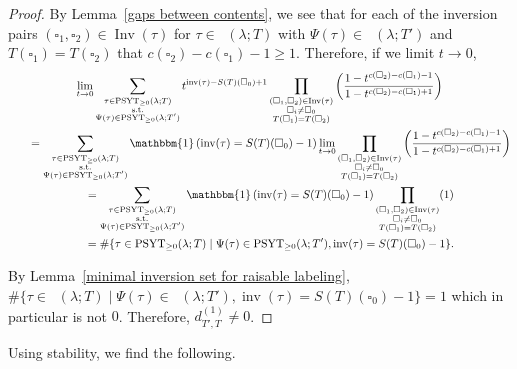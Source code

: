 \documentclass[10pt,a4paper]{amsart}
\numberwithin{equation}{section}
\theoremstyle{definition}
\DeclareMathOperator{\PSYT}{\mathrm{PSYT}_{\geq 0}}
\DeclareMathOperator{\Inv}{\mathrm{Inv}}
\DeclareMathOperator{\inv}{inv}
\begin{document}
\begin{proof}
By Lemma~\ref{gaps between contents}, we see that for each of the inversion pairs $(\square_1,\square_2) \in \Inv(\tau)$ for $\tau \in \PSYT(\lambda;T)$ with $\Psi(\tau) \in \PSYT(\lambda;T')$ and $T(\square_1) = T(\square_2)$ that $c(\square_2)-c(\square_1)-1 \geq 1$. Therefore, if we limit $t \rightarrow 0$,
\begin{gather*}
 \lim_{t \rightarrow 0} \sum_{\substack{\tau \in \PSYT(\lambda;T) \\ \text{s.t.}\\ \Psi(\tau) \in \PSYT(\lambda;T')}} t^{\inv(\tau) -S(T)(\square_0)+1} \prod_{\substack{(\square_1,\square_2) \in \Inv(\tau)\\ \square_i \neq \square_0 \\ T(\square_1)=T(\square_2)}} \left( \frac{1 - t^{c(\square_2)-c(\square_1)-1}}{1 -t^{c(\square_2)-c(\square_1)+1}} \right) \\
 \qquad = \sum_{\substack{\tau \in \PSYT(\lambda;T) \\ \text{s.t.}\\ \Psi(\tau) \in \PSYT(\lambda;T')}} \mathbbm{1}\left(\inv(\tau) = S(T)(\square_0)-1\right) \lim_{t \rightarrow 0} \prod_{\substack{(\square_1,\square_2) \in \Inv(\tau)\\ \square_i \neq \square_0 \\ T(\square_1)=T(\square_2)}} \left( \frac{1 - t^{c(\square_2)-c(\square_1)-1}}{1 -t^{c(\square_2)-c(\square_1)+1}} \right) \\
 \qquad = \sum_{\substack{\tau \in \PSYT(\lambda;T) \\ \text{s.t.}\\ \Psi(\tau) \in \PSYT(\lambda;T')}} \mathbbm{1}\left(\inv(\tau) = S(T)(\square_0)-1\right) \prod_{\substack{(\square_1,\square_2) \in \Inv(\tau)\\ \square_i \neq \square_0 \\ T(\square_1)=T(\square_2)}} (1) \\
 \qquad = \#\{ \tau \in \PSYT(\lambda;T) \mid \Psi(\tau) \in \PSYT(\lambda;T'), \inv(\tau)=S(T)(\square_0)-1\}.
\end{gather*}

By Lemma~\ref{minimal inversion set for raisable labeling}, $\#\{ \tau \in \PSYT(\lambda;T) \mid \Psi(\tau) \in \PSYT(\lambda;T'), \inv(\tau)=S(T)(\square_0)-1\} = 1$ which in particular is not $0$. Therefore, $d_{T',T}^{(1)} \neq 0$.
\end{proof}

Using stability, we find the following.
\end{document}
